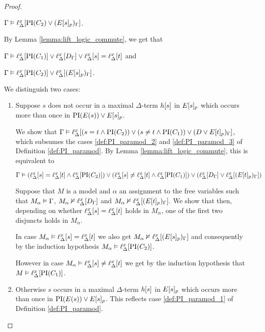 \begin{proof}
\begin{indproof}
			$\Gamma \entails \lif{\PI(C_2) \lor (E\occurat{s}{p})_\Gamma}$.

			By Lemma \ref{lemma:lift_logic_commute}, we get that 

			$\Gamma \entails \lif{\PI(C_1)} \lor \lif{D_\Gamma} \lor \lif{s}=\lif{t}$ and 

			$\Gamma \entails \lif{\PI(C_2)} \lor \lif{(E\occurat{s}{p})_\Gamma}$.

			We distinguish two cases:\nopagebreak
			\begin{enumerate}
				\item Suppose $s$ does not occur in a maximal $\Delta$-term $h\occur{s}$ in $E\occurat{s}{p}$ which occurs more than once in $\PI(E(s)) \lor E\occurat{s}{p}$.

					We show that $\Gamma \entails \lif{ (s=t \land \PI(C_2)) \lor (s\neq t \land \PI(C_1)) \lor (D \lor E\occurat{t}{p})_\Gamma}$, which subsumes the cases \ref{def:PI_paramod_2} and \ref{def:PI_paramod_3} of 
					Definition \ref{def:PI_paramod}. By Lemma \ref{lemma:lift_logic_commute}, this is equivalent to

					$\Gamma \entails (\lif{s}=\lif{t} \land \lif{\PI(C_2)}) \lor (\lif s\neq \lif t \land \lif{\PI(C_1)}) \lor (\lif{D_\Gamma} \lor \lif{(E\occurat{t}{p})_\Gamma})$

					Suppose that $M$ is a model and $\alpha$ an assignment to the free variables 
					such that $M_\alpha \entails \Gamma$,
					$M_\alpha \notentails \lift{\Delta}{ D_\Gamma }{x}$ and 
					$M_\alpha \notentails \lift{\Delta}{ (E\occurat{t}{p})_\Gamma }{x}$.
					We show that then, depending on whether $\lif{s} = \lif{t}$ holds in $M_\alpha$, one of the first two disjuncts holds in $M_\alpha$.

					In case $M_\alpha \entails \lif{s} = \lif{t}$ we also get
					$M_\alpha \notentails \lift{\Delta}{ (E\occurat{s}{p})_\Gamma }{x}$ and consequently by the induction hypothesis $M_\alpha\entails \lif{\PI(C_2)}$.

					However in case $M_\alpha \entails \lif{s} \neq \lif{t}$ we get by the induction hypothesis that 
					$M\entails \lif{\PI(C_1)}$.

					\label{njktahjtkhltah}

				\item Otherwise $s$ occurs in a maximal $\Delta$-term $h\occur{s}$ in $E\occurat{s}{p}$ which occurs more than once in $\PI(E(s)) \lor E\occurat{s}{p}$.
				This reflects case \ref{def:PI_paramod_1} of Definition \ref{def:PI_paramod}.


\end{enumerate}
\end{indproof}
\end{proof}
